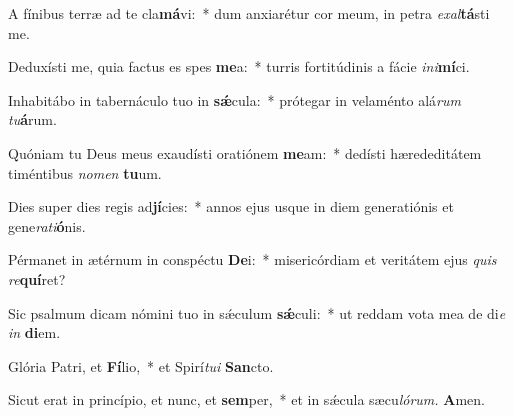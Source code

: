\item A fínibus terræ ad te cla\textbf{má}vi:~* dum anxiarétur cor meum, in petra \textit{exal}\textbf{tá}sti me.
\item Deduxísti me, quia factus es spes \textbf{me}a:~* turris fortitúdinis a fácie \textit{ini}\textbf{mí}ci.
\item Inhabitábo in tabernáculo tuo in \textbf{sǽ}cula:~* prótegar in velaménto alá\textit{rum} \textit{tu}\textbf{á}rum.
\item Quóniam tu Deus meus exaudísti oratiónem \textbf{me}am:~* dedísti hærededitátem timéntibus \textit{nomen} \textbf{tu}um.
\item Dies super dies regis ad\textbf{jí}cies:~* annos ejus usque in diem generatiónis et gene\hspace{0.03em}\textit{rati}\textbf{ó}nis.
\item Pérmanet in ætérnum in conspéctu \textbf{De}i:~* misericórdiam et veritátem ejus \textit{quis} \textit{re}\textbf{quí}ret?
\item Sic psalmum dicam nómini tuo in sǽculum \textbf{sǽ}culi:~* ut reddam vota mea de di\hspace{0.03em}\textit{e} \textit{in} \textbf{di}em.
\item Glória Patri, et \textbf{Fí}lio,~* et Spirí\hspace{0.03em}\textit{tui} \textbf{San}cto.
\item Sicut erat in princípio, et nunc, et \textbf{sem}per,~* et in sǽcula sæcu\hspace{0.03em}\textit{lórum.} \textbf{A}men.